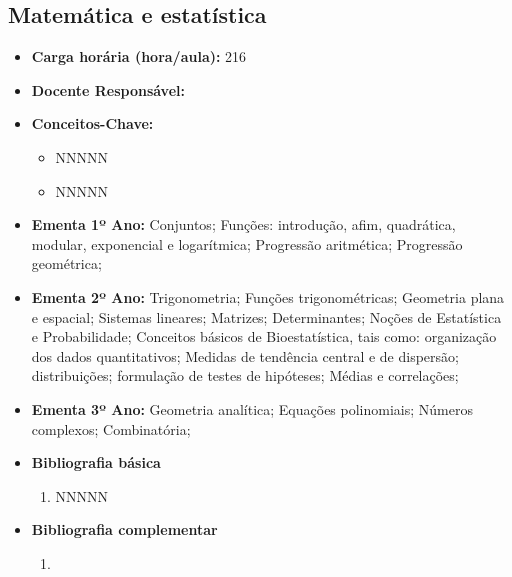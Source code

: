 \documentclass[11pt,fleqn]{book} %
\begin{document}
\newpage
\subsection{Matemática e estatística}\label{disc:matematica}
\begin{itemize}
	\item \textbf{Carga horária (hora/aula):} 216
	\item \textbf{Docente Responsável:}
	\item \textbf{Conceitos-Chave:}
	\begin{itemize}
		\item NNNNN
		\item NNNNN
	\end{itemize}
	\item \textbf{Ementa 1º Ano:} 
	Conjuntos;
	Funções: introdução, afim, quadrática, modular, exponencial e logarítmica;
	Progressão aritmética;
	Progressão geométrica;
	\item \textbf{Ementa 2º Ano:} 
	Trigonometria;
	Funções trigonométricas;
	Geometria plana e espacial;
	Sistemas lineares;
	Matrizes;
	Determinantes;
	Noções de Estatística e Probabilidade;
	Conceitos básicos de Bioestatística, tais como: organização dos dados quantitativos;
	Medidas de tendência central e de dispersão; distribuições; formulação de testes de hipóteses; 
	Médias e correlações;	
	\item \textbf{Ementa 3º Ano:} 
	Geometria analítica; 
	Equações polinomiais; 
	Números complexos; 
	Combinatória; 

	\item \textbf{Bibliografia básica}
	\begin{enumerate}
		\item NNNNN
	\end{enumerate}
	\item \textbf{Bibliografia complementar}
	\begin{enumerate}
		\item 
	\end{enumerate}	
\end{itemize}

\newpage
\end{document}
